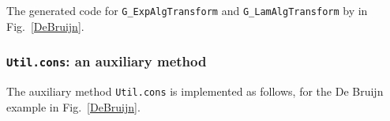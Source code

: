 The generated code for \lstinline{G_ExpAlgTransform} and \lstinline{G_LamAlgTransform} by \Name in Fig.~\ref{DeBruijn}.


\subsubsection{\lstinline{Util.cons}: an auxiliary method}\label{subsec:appendix_util_cons}

The auxiliary method \lstinline{Util.cons} is implemented as follows, for the De Bruijn example in Fig.~\ref{DeBruijn}.

